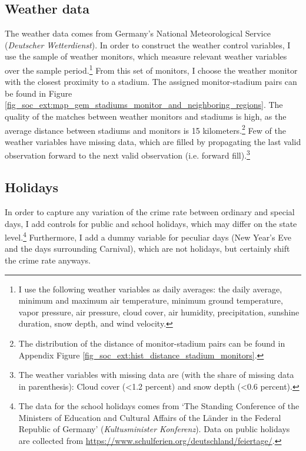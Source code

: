 \subsection{Weather data}
The weather data comes from Germany's National Meteorological Service (\textit{Deutscher Wetterdienst}). In order to construct the weather control variables, I use the sample of weather monitors, which measure relevant weather variables over the sample period.\footnote{I use the following weather variables as daily averages: the daily average, minimum and maximum air temperature, minimum ground temperature, vapor pressure, air pressure, cloud cover, air humidity, precipitation, sunshine duration, snow depth, and wind velocity.} From this set of monitors, I choose the weather monitor with the closest proximity to a stadium. The assigned monitor-stadium pairs can be found in Figure \ref{fig_soc_ext:map_gem_stadiums_monitor_and_neighboring_regions}. The quality of the matches between weather monitors and stadiums is high, as the average distance between stadiums and monitors is 15 kilometers.\footnote{The distribution of the distance of monitor-stadium pairs can be found in Appendix Figure \ref{fig_soc_ext:hist_distance_stadium_monitors}.} Few of the weather variables have missing data, which are filled by propagating the last valid observation forward to the next valid observation (i.e. forward fill).\footnote{The weather variables with missing data are (with the share of missing data in parenthesis): Cloud cover (<1.2 percent) and snow depth (<0.6 percent).}



\subsection{Holidays}
In order to capture any variation of the crime rate between ordinary and special days, I add controls for public and school holidays, which may differ on the state level.\footnote{The data for the school holidays comes from `The Standing Conference of the Ministers of Education and Cultural Affairs of the Länder in the Federal Republic of Germany' (\textit{Kultusminister Konferenz}). Data on public holidays are collected from \href{https://www.schulferien.org/deutschland/feiertage/}{https://www.schulferien.org/deutschland/feiertage/}.} Furthermore, I add a dummy variable for peculiar days (New Year's Eve and the days surrounding Carnival), which are not holidays, but certainly shift the crime rate anyways.



